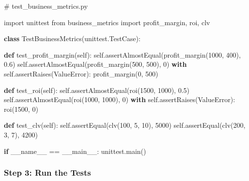 \documentclass[
  letterpaper,
  DIV=11,
  numbers=noendperiod]{scrreprt}
\newenvironment{Shaded}{\begin{snugshade}}{\end{snugshade}}
\newcommand{\CommentTok}[1]{\textcolor[rgb]{0.37,0.37,0.37}{#1}}
\newcommand{\ControlFlowTok}[1]{\textcolor[rgb]{0.00,0.23,0.31}{\textbf{#1}}}
\newcommand{\DecValTok}[1]{\textcolor[rgb]{0.68,0.00,0.00}{#1}}
\newcommand{\FloatTok}[1]{\textcolor[rgb]{0.68,0.00,0.00}{#1}}
\newcommand{\ImportTok}[1]{\textcolor[rgb]{0.00,0.46,0.62}{#1}}
\newcommand{\KeywordTok}[1]{\textcolor[rgb]{0.00,0.23,0.31}{\textbf{#1}}}
\newcommand{\NormalTok}[1]{\textcolor[rgb]{0.00,0.23,0.31}{#1}}
\newcommand{\OperatorTok}[1]{\textcolor[rgb]{0.37,0.37,0.37}{#1}}
\newcommand{\PreprocessorTok}[1]{\textcolor[rgb]{0.68,0.00,0.00}{#1}}
\newcommand{\StringTok}[1]{\textcolor[rgb]{0.13,0.47,0.30}{#1}}
\newcommand{\VariableTok}[1]{\textcolor[rgb]{0.07,0.07,0.07}{#1}}
\begin{document}
\begin{Shaded}
\begin{Highlighting}[]
\CommentTok{\# test\_business\_metrics.py}

\ImportTok{import}\NormalTok{ unittest}
\ImportTok{from}\NormalTok{ business\_metrics }\ImportTok{import}\NormalTok{ profit\_margin, roi, clv}

\KeywordTok{class}\NormalTok{ TestBusinessMetrics(unittest.TestCase):}

    \KeywordTok{def}\NormalTok{ test\_profit\_margin(}\VariableTok{self}\NormalTok{):}
        \VariableTok{self}\NormalTok{.assertAlmostEqual(profit\_margin(}\DecValTok{1000}\NormalTok{, }\DecValTok{400}\NormalTok{), }\FloatTok{0.6}\NormalTok{)}
        \VariableTok{self}\NormalTok{.assertAlmostEqual(profit\_margin(}\DecValTok{500}\NormalTok{, }\DecValTok{500}\NormalTok{), }\DecValTok{0}\NormalTok{)}
        \ControlFlowTok{with} \VariableTok{self}\NormalTok{.assertRaises(}\PreprocessorTok{ValueError}\NormalTok{):}
\NormalTok{            profit\_margin(}\DecValTok{0}\NormalTok{, }\DecValTok{500}\NormalTok{)}

    \KeywordTok{def}\NormalTok{ test\_roi(}\VariableTok{self}\NormalTok{):}
        \VariableTok{self}\NormalTok{.assertAlmostEqual(roi(}\DecValTok{1500}\NormalTok{, }\DecValTok{1000}\NormalTok{), }\FloatTok{0.5}\NormalTok{)}
        \VariableTok{self}\NormalTok{.assertAlmostEqual(roi(}\DecValTok{1000}\NormalTok{, }\DecValTok{1000}\NormalTok{), }\DecValTok{0}\NormalTok{)}
        \ControlFlowTok{with} \VariableTok{self}\NormalTok{.assertRaises(}\PreprocessorTok{ValueError}\NormalTok{):}
\NormalTok{            roi(}\DecValTok{1500}\NormalTok{, }\DecValTok{0}\NormalTok{)}

    \KeywordTok{def}\NormalTok{ test\_clv(}\VariableTok{self}\NormalTok{):}
        \VariableTok{self}\NormalTok{.assertEqual(clv(}\DecValTok{100}\NormalTok{, }\DecValTok{5}\NormalTok{, }\DecValTok{10}\NormalTok{), }\DecValTok{5000}\NormalTok{)}
        \VariableTok{self}\NormalTok{.assertEqual(clv(}\DecValTok{200}\NormalTok{, }\DecValTok{3}\NormalTok{, }\DecValTok{7}\NormalTok{), }\DecValTok{4200}\NormalTok{)}

\ControlFlowTok{if} \VariableTok{\_\_name\_\_} \OperatorTok{==} \StringTok{\textquotesingle{}\_\_main\_\_\textquotesingle{}}\NormalTok{:}
\NormalTok{    unittest.main()}
\end{Highlighting}
\end{Shaded}

\subsubsection{Step 3: Run the Tests}\label{step-3-run-the-tests}
\end{document}
